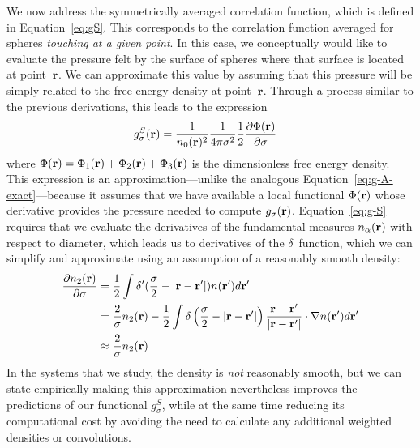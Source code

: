 We now address the symmetrically averaged correlation function, which
is defined in Equation~\ref{eq:gS}.  This corresponds to the
correlation function averaged for spheres \emph{touching at a given
  point}.  In this case, we conceptually would like to evaluate the
pressure felt by the surface of spheres where that surface is located
at point~$\textbf{r}$.  We can approximate this value by assuming that this
pressure will be simply related to the free energy density at
point~$\textbf{r}$.  Through a process similar to the previous derivations, this
leads to the expression
\begin{align}
  g_\sigma^S(\rr)%
  &= \frac{1}{n_0(\rr)^2}\frac{1}{ 4\pi \sigma^2}\frac12
  \frac{\partial \Phi(\rr)}{\partial \sigma} \label{eq:g-S}
\end{align}
where $\Phi(\textbf{r}) = \Phi_1(\textbf{r}) + \Phi_2(\textbf{r}) + \Phi_3(\textbf{r})$ is the
dimensionless free energy density.  This expression is an
approximation---unlike the analogous
Equation~\ref{eq:g-A-exact}---because it assumes that we have
available a local functional $\Phi(\textbf{r})$ whose derivative provides the
pressure needed to compute $g_\sigma(\textbf{r})$.  Equation~\ref{eq:g-S}
requires that we evaluate the derivatives of the fundamental measures
$n_\alpha(\textbf{r})$ with respect to diameter, which leads us to
derivatives of the $\delta$~function, which we can simplify and
approximate using an assumption of a reasonably smooth density:
\begin{align}
  \frac{\partial n_2(\textbf{r})}{\partial \sigma}
  &= \frac12 \int \delta'(\frac\sigma2 - |\textbf{r}-\textbf{r}'|) n(\textbf{r}')d\textbf{r}' \\
  &= \frac2{\sigma}n_2(\textbf{r}) - \frac12 \int \delta\left(\frac\sigma2 - |\textbf{r}-\textbf{r}'|\right)
  \frac{\textbf{r}-\textbf{r}'}{|\textbf{r}-\textbf{r}'|}\cdot\mathbf{\nabla}n(\textbf{r}')d\textbf{r}' \\
  &\approx \frac{2}{\sigma}n_2(\textbf{r})
\end{align}
In the systems that we study, the density is \emph{not} reasonably
smooth, but we can state empirically making this approximation
nevertheless improves the predictions of our functional $g_\sigma^S$, while at the
same time reducing its computational cost by avoiding the need to
calculate any additional weighted densities or convolutions.

